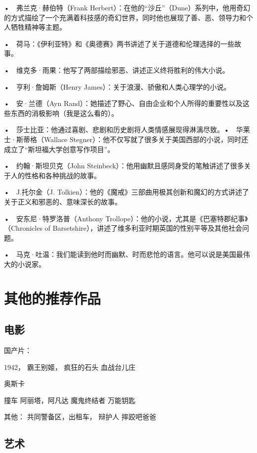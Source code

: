 •　弗兰克·赫伯特（Frank Herbert）：在他的“沙丘”（Dune）系列中，他用奇幻的方式描绘了一个充满着科技感的奇幻世界，同时他也展现了善、恶、领导力和个人牺牲精神等主题。

•　荷马：《伊利亚特》和《奥德赛》两书讲述了关于道德和伦理选择的一些故事。

•　维克多·雨果：他写了两部描绘邪恶、讲述正义终将胜利的伟大小说。


•　亨利·詹姆斯（Henry James）：关于浪漫、骄傲和人类心理学的小说。

•　安·兰德（Ayn Rand）：她描述了野心、自由企业和个人所得的重要性以及这些东西的消极影响（我是这么看的）。

•　莎士比亚：他通过喜剧、悲剧和历史剧将人类情感展现得淋漓尽致。•　华莱士·斯蒂格（Wallace Stegner）：他不仅写就了很多关于美国西部的小说，同时还成立了“斯坦福大学创意写作项目”。

•　约翰·斯坦贝克（John Steinbeck）：他用幽默且感同身受的笔触讲述了很多关于人的性格和各种挑战的故事。

•　J.托尔金（J. Tolkien）：他的《魔戒》三部曲用极其创新和魔幻的方式讲述了关于正义和邪恶的、意味深长的故事。

•　安东尼·特罗洛普（Anthony Trollope）：他的小说，尤其是《巴塞特郡纪事》（Chronicles of Barsetshire），讲述了维多利亚时期英国的性别平等及其他社会问题。

•　马克·吐温：我们能读到他时而幽默、时而悲怆的语言。他可以说是美国最伟大的小说家。







\section{其他的推荐作品}

\subsection{电影}

国产片：

 1942， 霸王别姬，  
 疯狂的石头
 血战台儿庄
 
奥斯卡

 撞车
 阿丽塔，阿凡达
 魔鬼终结者
 万能钥匙
 
其他：
 共同警备区，出租车， 辩护人
 摔跤吧爸爸   
 
 


\subsection{艺术}